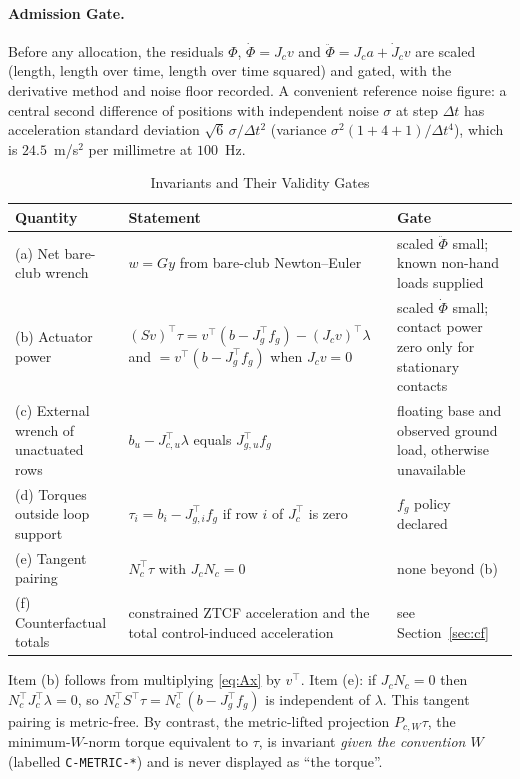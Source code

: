 \documentclass[11pt,a4paper]{article}
\begin{document}
\paragraph{Admission Gate.}
Before any allocation, the residuals $\Phi$, $\dot\Phi=J_cv$ and
$\ddot\Phi=J_ca+\dot J_cv$ are scaled (length, length over time, length over
time squared) and gated, with the derivative method and noise floor recorded.
A convenient reference noise figure: a central second difference of positions
with independent noise $\sigma$ at step $\Delta t$ has acceleration standard
deviation $\sqrt6\,\sigma/\Delta t^2$ (variance $\sigma^2(1+4+1)/\Delta t^4$),
which is $24.5$~m/s$^2$ per millimetre at $100$~Hz.

\begin{table}[ht]
\centering
\caption{Invariants and Their Validity Gates}
\label{tab:invariants}
\small
\begin{tabularx}{\textwidth}{@{}p{3.2cm}Xp{4.2cm}@{}}
\toprule
Quantity & Statement & Gate \\
\midrule
(a) Net bare-club wrench & $w=Gy$ from bare-club Newton--Euler & scaled $\ddot\Phi$ small; known non-hand loads supplied \\
(b) Actuator power & $(Sv)^{\top}\tau=v^{\top}(b-J_g^{\top}f_g)-(J_cv)^{\top}\lambda$ and $=v^{\top}(b-J_g^{\top}f_g)$ when $J_cv=0$ & scaled $\dot\Phi$ small; contact power zero only for stationary contacts \\
(c) External wrench of unactuated rows & $b_u-J_{c,u}^{\top}\lambda$ equals $J_{g,u}^{\top}f_g$ & floating base and observed ground load, otherwise unavailable \\
(d) Torques outside loop support & $\tau_i=b_i-J_{g,i}^{\top}f_g$ if row $i$ of $J_c^{\top}$ is zero & $f_g$ policy declared \\
(e) Tangent pairing & $N_c^{\top}\tau$ with $J_cN_c=0$ & none beyond (b) \\
(f) Counterfactual totals & constrained ZTCF acceleration and the total control-induced acceleration & see Section~\ref{sec:cf} \\
\bottomrule
\end{tabularx}
\end{table}

Item (b) follows from multiplying \eqref{eq:Ax} by $v^{\top}$.  Item (e): if
$J_cN_c=0$ then $N_c^{\top}J_c^{\top}\lambda=0$, so $N_c^{\top}S^{\top}\tau=
N_c^{\top}(b-J_g^{\top}f_g)$ is independent of $\lambda$.  This tangent
pairing is metric-free.  By contrast, the metric-lifted projection
$P_{c,W}\tau$, the minimum-$W$-norm torque equivalent to $\tau$, is invariant
\emph{given the convention $W$} (labelled \texttt{C-METRIC-*}) and is never
displayed as ``the torque''.
\end{document}
